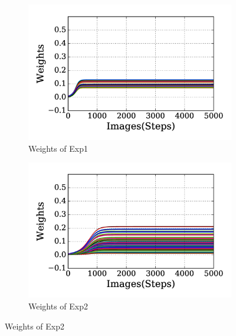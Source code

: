 \begin{figure}
	\centering
	\DIFdelbeginFL %
\DIFdelendFL \DIFaddbeginFL \begin{subfigure}[t]{0.48\textwidth}
		\DIFaddendFL \includegraphics[width=\textwidth]{pics_sdlm/20_exp_AE/exp1_weights_non.png}
		\caption{Weights of Exp1}
	\end{subfigure}
	\DIFdelbeginFL %
\DIFdelendFL \DIFaddbeginFL \begin{subfigure}[t]{0.48\textwidth}
		\DIFaddendFL \includegraphics[width=\textwidth]{pics_sdlm/20_exp_AE/exp2_weights_non.png}
		\caption{Weights of Exp2}
	\end{subfigure}
	\DIFdelbeginFL %

\end{figure}

